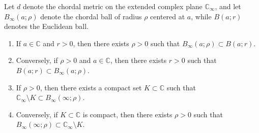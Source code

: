 Let $d$ denote the chordal metric on the extended complex plane $\mathbb{C}_\infty$, and let $B_\infty(a; \rho)$ denote the chordal ball of radius $\rho$ centered at $a$, while $B(a; r)$ denotes the Euclidean ball.

\begin{enumerate}
\item[(a)] If $a \in \mathbb{C}$ and $r > 0$, then there exists $\rho > 0$ such that $B_\infty(a; \rho) \subset B(a; r)$.
\item[(b)] Conversely, if $\rho > 0$ and $a \in \mathbb{C}$, then there exists $r > 0$ such that $B(a; r) \subset B_\infty(a; \rho)$.
\item[(c)] If $\rho > 0$, then there exists a compact set $K \subset \mathbb{C}$ such that $\mathbb{C}_\infty \setminus K \subset B_\infty(\infty; \rho)$.
\item[(d)] Conversely, if $K \subset \mathbb{C}$ is compact, then there exists $\rho > 0$ such that $B_\infty(\infty; \rho) \subset \mathbb{C}_\infty \setminus K$.
\end{enumerate}
